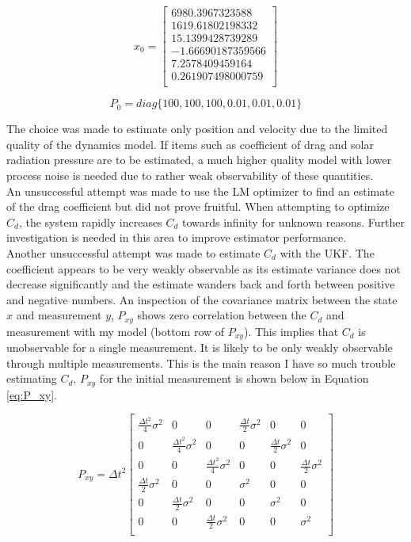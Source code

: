 \documentclass[11pt]{article}
\begin{document}
\begin{equation}
	\label{eq:LM_IC}
	x_0 = \begin{bmatrix}
	6980.3967323588 \\
	1619.61802198332 \\
	15.1399428739289 \\
	-1.66690187359566 \\
	7.2578409459164 \\
	0.261907498000759 \\	
	\end{bmatrix}
\end{equation}

\begin{equation}
	\label{eq:P0}
	P_0 = diag \{ 100, 100, 100, 0.01, 0.01, 0.01 \}
\end{equation}

The choice was made to estimate only position and velocity due to the limited quality of the dynamics model. If items such as coefficient of drag and solar radiation pressure are to be estimated, a much higher quality model with lower process noise is needed due to rather weak observability of these quantities. \\

An unsuccessful attempt was made to use the LM optimizer to find an estimate of the drag coefficient but did not prove fruitful. When attempting to optimize $C_d$, the system rapidly increases $C_d$ towards infinity for unknown reasons. Further investigation is needed in this area to improve estimator performance. \\

Another unsuccessful attempt was made to estimate $C_d$ with the UKF. The coefficient appears to be very weakly observable as its estimate variance does not decrease significantly and the estimate wanders back and forth between positive and negative numbers. An inspection of the covariance matrix between the state $x$ and measurement $y$, $P_{xy}$ shows zero correlation between the $C_d$ and measurement with my model (bottom row of $P_{xy}$). This implies that $C_d$ is unobservable for a single measurement. It is likely to be only weakly observable through multiple measurements. This is the main reason I have so much trouble estimating $C_d$. $P_{xy}$ for the initial measurement is shown below in Equation \eqref{eq:P_xy}.

\begin{equation}
\label{eq:P_xy}
P_{xy} = \Delta t^2 \begin{bmatrix}
\frac{\Delta t^2}{4} \sigma^2 & 0 & 0 & \frac{\Delta t}{2} \sigma^2 & 0 & 0 \\
0 & \frac{\Delta t^2}{4} \sigma^2 & 0 & 0 & \frac{\Delta t}{2} \sigma^2 & 0 \\
0 & 0 & \frac{\Delta t^2}{4} \sigma^2 & 0 & 0 & \frac{\Delta t}{2} \sigma^2 \\
\frac{\Delta t}{2} \sigma^2 & 0 & 0 & \sigma^2 & 0 & 0 \\
0 & \frac{\Delta t}{2} \sigma^2 & 0 & 0 & \sigma^2 & 0 \\
0 & 0 & \frac{\Delta t}{2} \sigma^2 & 0 & 0 & \sigma^2 \\	
\end{bmatrix}
\end{equation}
\end{document}

